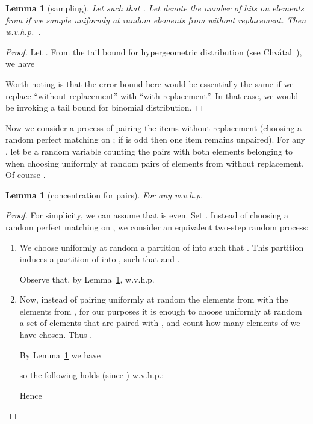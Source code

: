 \documentclass{article}[11pt,a4paper]
\newtheorem{lemma}[definition]{Lemma}
\begin{document}
\begin{lemma}[sampling]
\label{lem:sampling}
Let  such that . Let  denote the number of hits on
elements from  if we sample uniformly at random  elements from 
without replacement. Then w.v.h.p.\ .
\end{lemma}


\begin{proof}
Let .
From the tail bound for hypergeometric distribution (see Chv\'atal~\cite{chvatal}), we have


Worth noting is that the error bound here would be essentially the same if we replace ``without replacement'' with ``with replacement''. In that case, we would be invoking a tail bound for binomial distribution.
\end{proof}

Now we consider a process of pairing the items without replacement (choosing a random
perfect matching on ; if  is odd then one item remains unpaired). For any ,
let  be a random variable counting the pairs with both elements belonging to  when
choosing uniformly at random  pairs of elements from  without replacement.
Of course .

\begin{lemma}[concentration for pairs]
\label{lem:pairs}
For any  w.v.h.p.

\end{lemma}

\begin{proof}
For simplicity, we can assume that  is even.
Set .
Instead of choosing a random perfect matching on , we consider an equivalent two-step random process:
\begin{enumerate} 
\item We choose uniformly at random a partition of  into  such that . This partition induces a partition of  into , such that  and .

Observe that, by Lemma~\ref{lem:sampling},  w.v.h.p.

\item Now, instead of pairing uniformly at random the elements from  with the elements from , for our purposes it is enough to choose uniformly at random a set  of elements that are paired with , and count how many elements of  we have chosen. Thus .

By Lemma~\ref{lem:sampling} we have

so the following holds (since ) w.v.h.p.:

Hence

\end{enumerate}
\end{proof}
\end{document}
